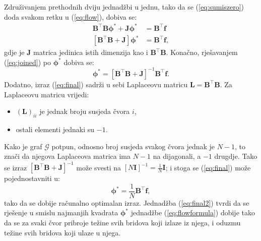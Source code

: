 \documentclass[lmodern, utf8, diplomski, numeric]{fer}
\newcommand{\matr}[1]{\mathbold{#1}}
\newcommand{\graph}[1]{\mathcal{#1}}
\newcommand{\T}{\top}
\newcommand{\q}{\left}
\newcommand{\w}{\right}
\begin{document}
  Združivanjem prethodnih dviju jednadžbi u jednu, tako da se (\ref{eq:sumiszero}) doda svakom retku u (\ref{eq:flow}), dobiva se:
  \begin{align}
  \matr{B}^\T \matr{B} \matr{\phi^*} + \matr{J} \matr{\phi^*} &= \matr{B}^\T \matr{f} \nonumber \\
  \label{eq:joined}
  \q[\matr{B}^\T \matr{B} + \matr{J} \w] \matr{\phi^*} &= \matr{B}^\T \matr{f},
  \end{align}
  gdje je $\matr{J}$ matrica jedinica istih dimenzija kao i $\matr{B}^\T \matr{B}$.
  Konačno, rješavanjem (\ref{eq:joined}) po $\matr{\phi^*}$ dobiva se:
  \begin{equation}
  \label{eq:final}
  \matr{\phi^*} = \q[\matr{B}^\T \matr{B} + \matr{J} \w]^{-1} \matr{B}^\T \matr{f}.
  \end{equation}
  Dodatno, izraz (\ref{eq:final}) sadrži u sebi Laplaceovu matricu $\matr{L} = \matr{B}^\T\matr{B}$.
  Za Laplaceovu matricu vrijedi:
  \begin{itemize}
    \item $(\matr{L})_{ii}$ je jednak broju susjeda čvora $i$,
    \item ostali elementi jednaki su $-1$.
  \end{itemize}
  Kako je graf $\graph{G}$ potpun, odnosno broj susjeda svakog čvora jednak je $N - 1$, to znači da njegova Laplaceova matrica ima $N - 1$ na dijagonali, a $-1$ drugdje. Tako se izraz $\q[ \matr{B}^\T \matr{B} + \matr{J} \w]^{-1}$ može svesti na $\q[ N \matr{I} \w]^{-1} = \frac{1}{N} \matr{I}$; i stoga se (\ref{eq:final}) može pojednostavniti u:
  \begin{equation}
  \label{eq:final2}
  \matr{\phi^*} = \frac{1}{N} \matr{B}^\T \matr{f},
  \end{equation}
  tako da se dobije računalno optimalan izraz.
  Jednadžba (\ref{eq:final2}) tvrdi da se rješenje u smislu najmanjih kvadrata $\matr{\phi^*}$ jednadžbe (\ref{eq:flowformula}) dobije tako da se za svaki čvor pribroje težine svih bridova koji izlaze iz njega, i oduzmu težine svih bridova koji ulaze u njega.
  
\end{document}
